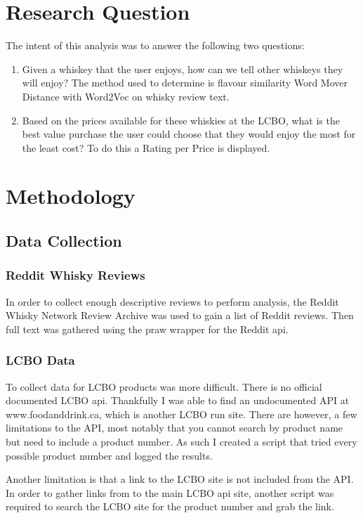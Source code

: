 \documentclass{article}
\begin{document}
\newpage
\section{Research Question}
The intent of this analysis was to answer the following two questions:
\begin{enumerate}
    \item Given a whiskey that the user enjoys, how can we tell other whiskeys they will enjoy? The method used to determine is flavour similarity Word Mover Distance with Word2Vec on whisky review text.
    \item Based on the prices available for these whiskies at the LCBO, what is the best value purchase the user could choose that they would enjoy the most for the least cost? To do this a Rating per Price is displayed.
\end{enumerate}

\section{Methodology}

\subsection{Data Collection}

\subsubsection{Reddit Whisky Reviews}
In order to collect enough descriptive reviews to perform analysis, the Reddit Whisky Network Review Archive \cite{redditwhisky} was used to gain a list of Reddit reviews. Then full text was gathered using the praw wrapper for the Reddit api.

\subsubsection{LCBO Data}
To collect data for LCBO products was more difficult. There is no official documented LCBO api. Thankfully I was able to find an undocumented API at www.foodanddrink.ca, which is another LCBO run site. There are however, a few limitations to the API, most notably that you cannot search by product name but need to include a product number. As such I created a script that tried every possible product number and logged the results.

Another limitation is that a link to the LCBO site is not included from the API. In order to gather links from to the main LCBO api site, another script was required to search the LCBO site for the product number and grab the link.
\end{document}
